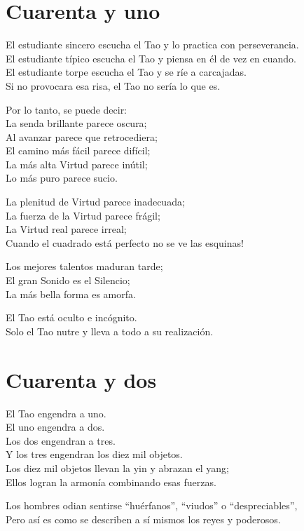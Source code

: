 \documentclass[hidelinks]{memoir}
\begin{document}
	\chapter*{Cuarenta y uno}
	
	El estudiante sincero escucha el Tao y lo practica con perseverancia.\\
	El estudiante típico escucha el Tao y piensa en él de vez en cuando.\\
	El estudiante torpe escucha el Tao y se ríe a carcajadas.\\
	Si no provocara esa risa, el Tao no sería lo que es.
	
	Por lo tanto, se puede decir:\\
	La senda brillante parece oscura;\\
	Al avanzar parece que retrocediera;\\
	El camino más fácil parece difícil;\\
	La más alta Virtud parece inútil;\\
	Lo más puro parece sucio.
	
	La plenitud de Virtud parece inadecuada;\\
	La fuerza de la Virtud parece frágil;\\
	La Virtud real parece irreal;\\
	Cuando el cuadrado está perfecto no se ve las esquinas!
	
	Los mejores talentos maduran tarde;\\
	El gran Sonido es el Silencio;\\
	La más bella forma es amorfa.
	
	El Tao está oculto e incógnito.\\
	Solo el Tao nutre y lleva a todo a su realización.
	
	\chapter*{Cuarenta y dos}
	
	El Tao engendra a uno.\\
	El uno engendra a dos.\\
	Los dos engendran a tres.\\
	Y los tres engendran los diez mil objetos.\\
	Los diez mil objetos llevan la yin y abrazan el yang;\\
	Ellos logran la armonía combinando esas fuerzas.
	
	Los hombres odian sentirse ``huérfanos'', ``viudos'' o
	``despreciables'',\\
	Pero así es como se describen a sí mismos los reyes y poderosos.
	
\end{document}
